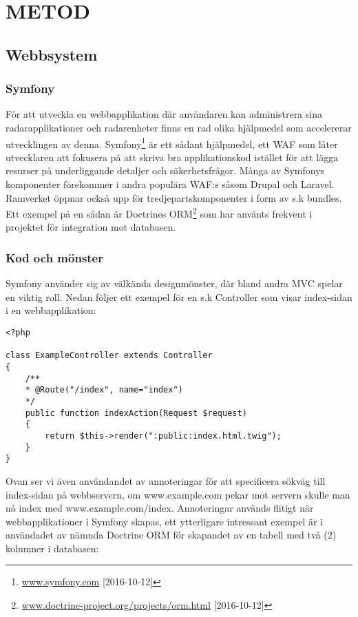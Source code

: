 \chapter{METOD}
\thispagestyle{fancy}
\section{Webbsystem}

\subsection{Symfony}
För att utveckla en webbapplikation där användaren kan administrera sina radarapplikationer och radarenheter finns en rad olika hjälpmedel som accelererar utvecklingen av denna. Symfony\footnote{\url{www.symfony.com} [2016-10-12]} är ett sådant hjälpmedel, ett \acs{WAF} som låter utvecklaren att fokusera på att skriva bra applikationskod istället för att lägga resurser på underliggande detaljer och säkerhetsfrågor. Många av Symfonys komponenter förekommer i andra populära \acs{WAF}:s såsom Drupal och Laravel. Ramverket öppnar också upp för tredjepartskomponenter i form av s.k bundles. Ett exempel på en sådan är Doctrines \ac{ORM}\footnote{\url{www.doctrine-project.org/projects/orm.html} [2016-10-12]} som har använts frekvent i projektet för integration mot databasen.

\subsection*{Kod och mönster}
Symfony använder sig av välkända designmönster, där bland andra \ac{MVC} spelar en viktig roll. Nedan följer ett exempel för en s.k Controller som visar index-sidan i en webbapplikation:
\newpage

\begin{lstlisting}[caption=Exempel på kod i Symfony, label=symfony]
<?php

class ExampleController extends Controller
{
    /**
    * @Route("/index", name="index")
    */
    public function indexAction(Request $request)
    {
        return $this->render(":public:index.html.twig");
    }
}
\end{lstlisting}
Ovan ser vi även användandet av annoteringar för att specificera sökväg till index-sidan på webbservern, om www.example.com pekar mot servern skulle man nå index med www.example.com/index. Annoteringar används flitigt när webbapplikationer i Symfony skapas, ett ytterligare intressant exempel är i användadet av nämnda Doctrine \acs{ORM} för skapandet av en tabell med två (2) kolumner i databasen:


